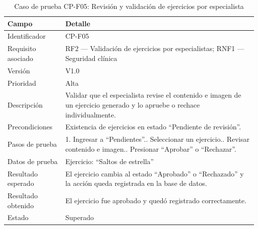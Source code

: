 				\begin{table}[H]
					\centering\small
					\caption{Caso de prueba CP-F05: Revisión y validación de ejercicios por especialista}
					\label{tab:cpf05}
					\begin{tabular}{p{3cm}p{12.0cm}}
						\hline
						\textbf{Campo} & \textbf{Detalle}\\
						\hline
						Identificador & CP-F05\\
						Requisito asociado & RF2 --- Validación de ejercicios por especialistas; RNF1 --- Seguridad clínica\\
						Versión & V1.0\\
						Prioridad & Alta\\
						Descripción & Validar que el especialista revise el contenido e imagen de un ejercicio generado y lo apruebe o rechace individualmente.\\
						Precondiciones & Existencia de ejercicios en estado ``Pendiente de revisión''.\\
						Pasos de prueba & 1. Ingresar a ``Pendientes''.\newline 2. Seleccionar un ejercicio.\newline 3. Revisar contenido e imagen.\newline 4. Presionar ``Aprobar'' o ``Rechazar''.\\
						Datos de prueba & Ejercicio: ``Saltos de estrella''\\
						Resultado esperado & El ejercicio cambia al estado ``Aprobado'' o ``Rechazado'' y la acción queda registrada en la base de datos.\\
						Resultado obtenido & El ejercicio fue aprobado y quedó registrado correctamente.\\
						Estado & Superado\\
						\hline
					\end{tabular}
				\end{table}
				\tblnote
				
